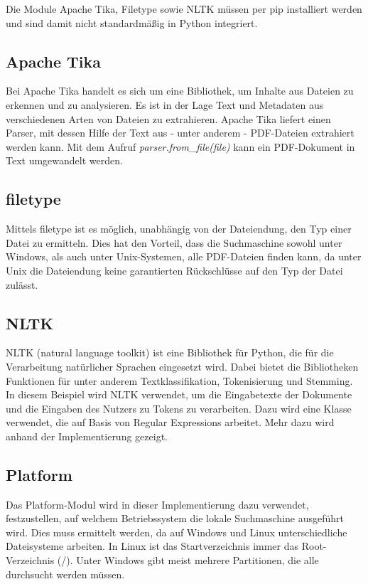 Die Module Apache Tika, Filetype sowie NLTK müssen per pip installiert werden und sind damit nicht standardmäßig in Python integriert.


\subsection{Apache Tika}\label{apache-tika}
Bei Apache Tika handelt es sich um eine Bibliothek, um Inhalte aus Dateien zu erkennen und zu analysieren. Es ist in der Lage Text und Metadaten aus verschiedenen Arten von Dateien zu extrahieren. Apache Tika liefert einen Parser, mit dessen Hilfe der Text aus - unter anderem - PDF-Dateien extrahiert werden kann. Mit dem Aufruf \textit{parser.from\_file(file)} kann ein PDF-Dokument in Text umgewandelt werden.

\subsection{filetype}\label{python-magic}
Mittels filetype ist es möglich, unabhängig von der Dateiendung, den Typ einer Datei zu ermitteln. Dies hat den Vorteil, dass die Suchmaschine sowohl unter Windows, als auch unter Unix-Systemen, alle PDF-Dateien finden kann, da unter Unix die Dateiendung keine garantierten Rückschlüsse auf den Typ der Datei zulässt.

\subsection{NLTK}\label{nltk}
NLTK (natural language toolkit) ist eine Bibliothek für Python, die für die Verarbeitung natürlicher Sprachen eingesetzt wird. Dabei bietet die Bibliotheken Funktionen für unter anderem Textklassifikation, Tokenisierung und Stemming.
In diesem Beispiel wird NLTK verwendet, um die Eingabetexte der Dokumente und die Eingaben des Nutzers zu Tokens zu verarbeiten. Dazu wird eine Klasse verwendet, die auf Basis von Regular Expressions arbeitet. Mehr dazu wird anhand der Implementierung gezeigt. %

\subsection{Platform}
Das Platform-Modul wird in dieser Implementierung dazu verwendet, festzustellen, auf welchem Betriebssystem die lokale Suchmaschine ausgeführt wird. Dies muss ermittelt werden, da auf Windows und Linux unterschiedliche Dateisysteme arbeiten. In Linux ist das Startverzeichnis immer das Root-Verzeichnis (\glqq /\grqq). Unter Windows gibt meist mehrere Partitionen, die alle durchsucht werden müssen.

